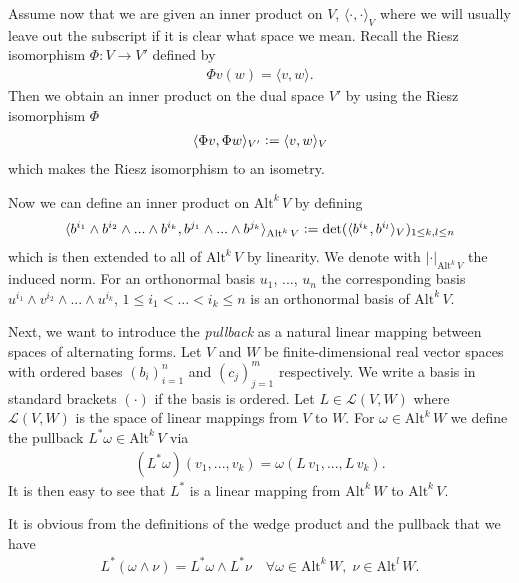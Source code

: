 \documentclass[12pt,a4paper]{article}
\numberwithin{equation}{subsection}
\numberwithin{lemma}{subsection}
\theoremstyle{definition}
\newcommand{\alternating}[2]{ {\text{Alt}^{#1}\,#2} }
\begin{document}
Assume now that we are given an inner product on $V$, 
$\langle \cdot, \cdot \rangle_V$ where we will usually leave out the 
subscript if it is clear what space we mean.
Recall the Riesz isomorphism $\Phi: V \rightarrow V'$ defined by
\begin{align*}
    \Phi v (w) = \langle v, w \rangle.
\end{align*}
Then we obtain an inner 
product on the dual space $V'$ by using the Riesz isomorphism $\Phi$ 
\begin{align*}
    \langle \Phi v, \Phi w \rangle_{V'} \vcentcolon= \langle v, w \rangle_V
\end{align*}
which makes the Riesz isomorphism to an isometry.

Now we can define an inner product on $\alternating{k}{V}$ by defining
\begin{align*}
    \langle b^{i_1} \wedge b^{i_2} \wedge... \wedge b^{i_k}, 
    b^{j_1} \wedge... \wedge b^{j_k} \rangle_{\alternating{k}{V}} 
    \vcentcolon= \det  ( \langle b^{i_k}, b^{i_l} \rangle_V )_
    {1\leq k,l \leq n} 
\end{align*}
which is then extended to all of $\alternating{k}{V}$ by linearity. 
We denote with $\lvert \cdot \rvert _\alternating{k}{V}$ the induced norm.
For an orthonormal basis 
$u_1$, ..., $u_n$ the corresponding basis 
$u^{i_1} \wedge v^{i_2} \wedge ... \wedge u^{i_k}$, 
$1\leq i_1 < ... < i_k \leq n$ is an orthonormal basis of $\alternating{k}{V}$.


Next, we want to introduce the \textit{pullback} as a natural linear
mapping between spaces of alternating forms. 
Let $V$ and $W$ be finite-dimensional real
vector spaces with ordered bases $(b_i)_{i=1}^n$ and $(c_j)_{j=1}^m$ 
respectively. We write a basis in standard brackets $(\cdot)$ if the basis is 
ordered. Let $L \in \mathcal{L}(V,W)$ where $\mathcal{L}(V,W)$ is the 
space of linear mappings from $V$ to $W$. For $\omega \in \alternating{k}{W}$
we define the pullback $L^* \omega \in \alternating{k}{V}$ via 
\begin{align*}
    (L^* \omega)(v_1,...,v_k) = \omega(L\,v_1,...,L\,v_k).
\end{align*}
It is then easy to see that 
$L^*$ is a linear mapping from $\alternating{k}{W}$ to 
$\alternating{k}{V}$. 

It is obvious from the definitions of the wedge product and 
the pullback that we have 
\begin{align*}
    L^*(\omega \wedge \nu) = L^*\omega \wedge L^* \nu \quad \forall 
        \omega \in \alternating{k}{W}, \; \nu \in \alternating{l}{W}.
\end{align*}
\end{document}
